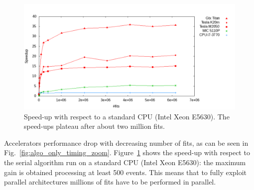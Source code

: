 \documentclass[a4]{jpconf}
\begin{document}
\begin{figure}[tbp]
  \centering
  \includegraphics[width=0.9\linewidth]{figures/Speedup_MIC}
  \caption{Speed-up with respect to a standard CPU (Intel Xeon
    E5630). The speed-ups plateau after about two million fits.}
  \label{fig:algo_only_speedup}
\end{figure}
Accelerators performance drop with decreasing number of fits, as can be seen 
in Fig.~\ref{fig:algo_only_timing_zoom}.
Figure~\ref{fig:algo_only_speedup} shows the speed-up with respect to the serial 
algorithm run on a standard CPU (Intel Xeon E5630): the maximum gain is 
obtained processing at least 500 events. This means that to fully exploit 
parallel architectures millions of fits have to be performed in parallel.  


%
\end{document}
